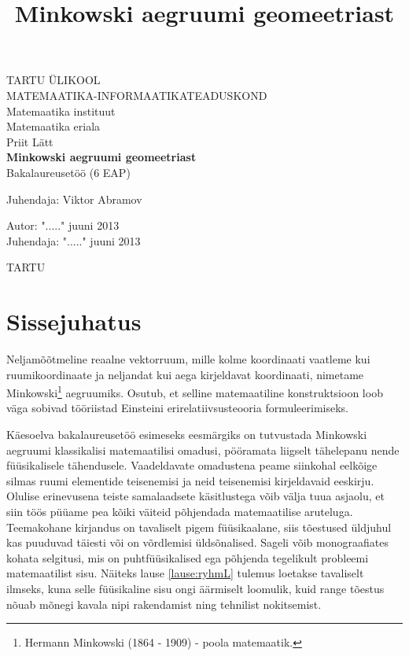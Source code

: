 \documentclass[12pt]{article}
\title{Minkowski aegruumi geomeetriast}
\theoremstyle{plain}
\theoremstyle{definition}
\numberwithin{equation}{section}
\begin{document}
\begin{titlepage}
\begin{center}

{\large TARTU ÜLIKOOL}\\[0.3cm]
{\large MATEMAATIKA-INFORMAATIKATEADUSKOND}\\[0.3cm]
{\large Matemaatika instituut}\\[0.3cm]
{\large Matemaatika eriala}\\[3cm]

{\large Priit Lätt}\\[0.3cm]
{\huge \textbf{Minkowski aegruumi geomeetriast}}\\[0.3cm]
{\large Bakalaureusetöö (6 EAP)}\\[3cm]

\begin{flushright}
{\large Juhendaja: Viktor Abramov}
\end{flushright}

\vfill

\begin{flushleft}
{\large
Autor: \dotfill "....." juuni 2013\\
Juhendaja: \dotfill "....." juuni 2013\\[2cm]
}
\end{flushleft}
{\large TARTU \the\year}

\end{center}
\end{titlepage}

\tableofcontents

\newpage
\section*{Sissejuhatus}

Neljamõõtmeline reaalne vektorruum, mille kolme koordinaati 
vaatleme kui ruumikoordinaate ja neljandat kui aega kirjeldavat 
koordinaati, nimetame Minkowski\footnote{Hermann Minkowski 
(1864 - 1909) - poola matemaatik.} aegruumiks. Osutub, et 
selline matemaatiline konstruktsioon loob väga sobivad 
tööriistad Einsteini erirelatiivsusteooria formuleerimiseks.

Käesoelva bakalaureusetöö esimeseks eesmärgiks on 
tutvustada Minkowski aeg\-ruumi klassikalisi matemaatilisi 
omadusi, pööramata liigselt tähelepanu nende füü\-sikalisele 
tähendusele. Vaadeldavate omadustena peame siinkohal 
eelkõige silmas ruumi elementide teisenemisi ja neid 
teisenemisi kirjeldavaid eeskirju. 
Olulise erinevusena teiste samalaadsete käsitlustega võib 
välja tuua asjaolu, et siin töös püüame pea kõiki väiteid 
põhjendada matemaatilise aruteluga. Teemakohane kirjandus 
on tavaliselt pigem füüsikaalane, siis tõestused üldjuhul kas 
puuduvad täiesti või on võrdlemisi üldsõnalised. Sageli võib 
monograafiates kohata selgitusi, mis on puhtfüüsikalised ega 
põhjenda tegelikult probleemi matemaatilist sisu. Näiteks lause
\ref{lause:ryhmL} tulemus loetakse tavaliselt ilmseks, kuna 
selle füüsikaline sisu ongi äärmiselt loomulik, kuid range 
tõestus nõuab mõnegi kavala nipi rakendamist ning tehnilist 
nokitsemist. 
\end{document}
